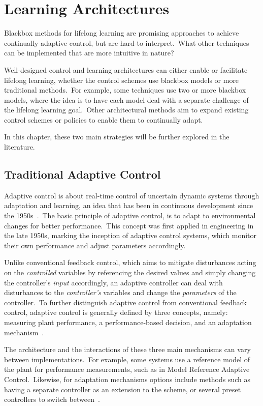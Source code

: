 \chapter{Learning Architectures}\label{ch:architecture}
Blackbox methods for lifelong learning are promising approaches to achieve continually adaptive control, but are hard-to-interpret.\ What other techniques can be implemented that are more intuitive in nature?

Well-designed control and learning architectures can either enable or facilitate lifelong learning, whether the control schemes use blackbox models or more traditional methods.\ For example, some techniques use two or more blackbox models, where the idea is to have each model deal with a separate challenge of the lifelong learning goal.\ Other architectural methods aim to expand existing control schemes or policies to enable them to continually adapt.

In this chapter, these two main strategies will be further explored in the literature.


\section{Traditional Adaptive Control}\label{sec:adaptive-control}
Adaptive control is about real-time control of uncertain dynamic systems through adaptation and learning, an idea that has been in continuous development since the 1950s~\cite[section 2]{Annaswamy2021}.\ The basic principle of adaptive control, is to adapt to environmental changes for better performance.\ This concept was first applied in engineering in the late 1950s, marking the inception of adaptive control systems, which monitor their own performance and adjust parameters accordingly.

Unlike conventional feedback control, which aims to mitigate disturbances acting on the \emph{controlled} variables by referencing the desired values and simply changing the controller's \emph{input} accordingly, an adaptive controller can deal with disturbances to the \emph{controller's} variables and change the \emph{parameters} of the controller.\ To further distinguish adaptive control from conventional feedback control, adaptive control is generally defined by three concepts, namely: measuring plant performance, a performance-based decision, and an adaptation mechanism~\cite[section 1.2]{Landau2011}.\

The architecture and the interactions of these three main mechanisms can vary between implementations.\ For example, some systems use a reference model of the plant for performance measurements, such as in Model Reference Adaptive Control.\ Likewise, for adaptation mechanisms options include methods such as having a separate controller as an extension to the scheme, or several preset controllers to switch between~\cite[section 1.3]{Landau2011}.

